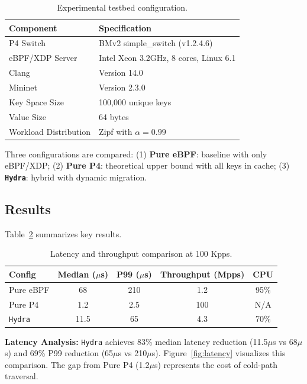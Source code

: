 \documentclass[sigconf,anonymous,10pt]{acmart}
\newcommand{\hydra}{\texttt{Hydra}}
\begin{document}
\begin{table}[t]
    \centering
    \caption{Experimental testbed configuration.}
    \label{tab:setup}
    \begin{tabular}{ll}
        \toprule
        Component & Specification \\
        \midrule
        P4 Switch & BMv2 simple\_switch (v1.2.4.6) \\
        eBPF/XDP Server & Intel Xeon 3.2GHz, 8 cores, Linux 6.1 \\
        Clang & Version 14.0 \\
        Mininet & Version 2.3.0 \\
        Key Space Size & 100,000 unique keys \\
        Value Size & 64 bytes \\
        Workload Distribution & Zipf with $\alpha = 0.99$ \\
        \bottomrule
    \end{tabular}
\end{table}

Three configurations are compared: (1) \textbf{Pure eBPF}: baseline with only eBPF/XDP; (2) \textbf{Pure P4}: theoretical upper bound with all keys in cache; (3) \textbf{\hydra{}}: hybrid with dynamic migration.

\subsection{Results}
Table~\ref{tab:results} summarizes key results.

\begin{table}[t]
    \centering
    \caption{Latency and throughput comparison at 100 Kpps.}
    \label{tab:results}
    \begin{tabular}{lcccc}
        \toprule
        Config & Median ($\mu$s) & P99 ($\mu$s) & Throughput (Mpps) & CPU \\
        \midrule
        Pure eBPF & 68 & 210 & 1.2 & 95\% \\
        Pure P4 & 1.2 & 2.5 & 100 & N/A \\
        \hydra{} & 11.5 & 65 & 4.3 & 70\% \\
        \bottomrule
    \end{tabular}
\end{table}

\textbf{Latency Analysis:} \hydra{} achieves 83\% median latency reduction (11.5$\mu$s vs 68$\mu$s) and 69\% P99 reduction (65$\mu$s vs 210$\mu$s). Figure~\ref{fig:latency} visualizes this comparison. The gap from Pure P4 (1.2$\mu$s) represents the cost of cold-path traversal.
\end{document}
